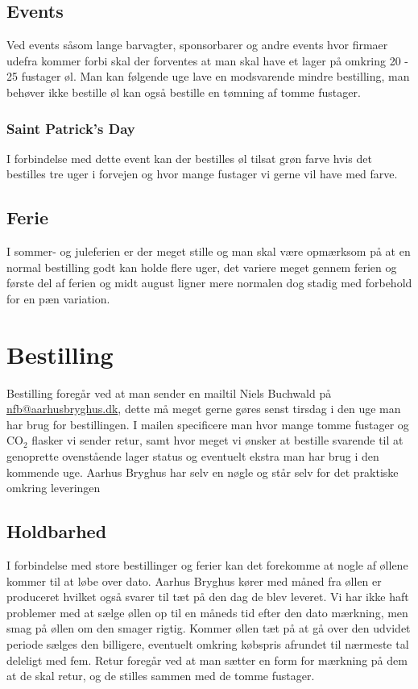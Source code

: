 \subsection{Events}

Ved events såsom lange barvagter, sponsorbarer og andre events hvor firmaer udefra kommer forbi skal der forventes
at man skal have et lager på omkring 20 - 25 fustager øl. Man kan følgende uge lave en modsvarende mindre bestilling,
man behøver ikke bestille øl kan også bestille en tømning af tomme fustager.

\subsubsection{Saint Patrick's Day}

I forbindelse med dette event kan der bestilles øl tilsat grøn farve hvis det bestilles tre uger i forvejen og hvor mange
fustager vi gerne vil have med farve.

\subsection{Ferie}

I sommer- og juleferien er der meget stille og man skal være opmærksom på at en normal bestilling
godt kan holde flere uger, det variere meget gennem ferien og første del af ferien og
midt august ligner mere normalen dog stadig med forbehold for en pæn variation.


\section{Bestilling}

Bestilling foregår ved at man sender en mailtil Niels Buchwald på \\
\href{mailto:nfb@aarhusbryghus.dk}{nfb@aarhusbryghus.dk}, dette må meget gerne gøres senst tirsdag i den uge man har brug for bestillingen.
I mailen specificere man hvor mange tomme fustager og CO$_{2}$ flasker vi sender retur, samt hvor meget vi ønsker at bestille
svarende til at genoprette ovenstående lager status og eventuelt ekstra man har brug i den kommende uge.
Aarhus Bryghus har selv en nøgle og står selv for det praktiske omkring leveringen

\subsection{Holdbarhed}

I forbindelse med store bestillinger og ferier kan det forekomme at nogle af øllene kommer til at løbe over dato.
Aarhus Bryghus kører med måned fra øllen er produceret hvilket også svarer til tæt på den dag de blev leveret.
Vi har ikke haft problemer med at sælge øllen op til en måneds tid efter den dato mærkning, men smag på øllen
om den smager rigtig. Kommer øllen tæt på at gå over den udvidet periode sælges den billigere,
eventuelt omkring købspris afrundet til nærmeste tal deleligt med fem.
Retur foregår ved at man sætter en form for mærkning på dem at de skal retur, og de stilles sammen
med de tomme fustager.

